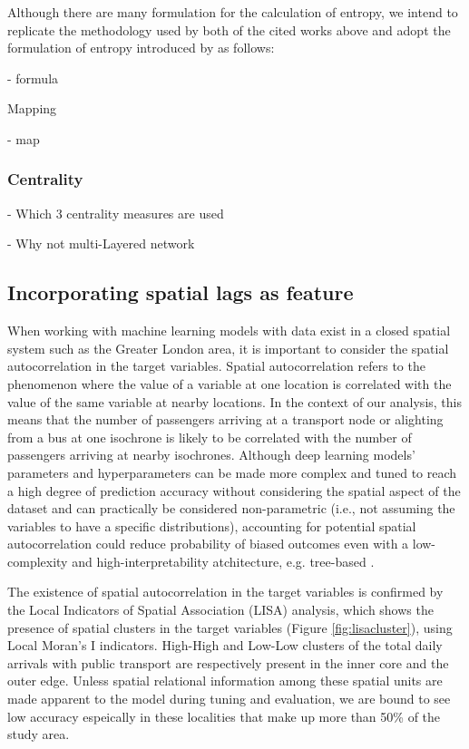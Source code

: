 Although there are many formulation for the calculation of entropy, we intend to replicate the methodology used by both of the cited works above and adopt the formulation of entropy introduced by \citet{shannonMathematicalTheoryCommunication1948} as follows:

- formula

Mapping

- map



\subsubsection*{Centrality}
- Which 3 centrality measures are used




- Why not multi-Layered network
\subsection{Incorporating spatial lags as feature}

When working with machine learning models with data exist in a closed spatial system such as the Greater London area, it is important to consider the spatial autocorrelation in the target variables. Spatial autocorrelation refers to the phenomenon where the value of a variable at one location is correlated with the value of the same variable at nearby locations. In the context of our analysis, this means that the number of passengers arriving at a transport node or alighting from a bus at one isochrone is likely to be correlated with the number of passengers arriving at nearby isochrones. Although deep learning models' parameters and hyperparameters can be made more complex and tuned to reach a high degree of prediction accuracy without considering the spatial aspect of the dataset and can practically be considered non-parametric (i.e., not assuming the variables to have a specific distributions), accounting for potential spatial autocorrelation could reduce probability of biased outcomes even with a low-complexity and high-interpretability atchitecture, e.g. tree-based \citep{meyerImportanceSpatialPredictor2019}.

The existence of spatial autocorrelation in the target variables is confirmed by the Local Indicators of Spatial Association (LISA) analysis, which shows the presence of spatial clusters in the target variables (Figure \ref{fig:lisacluster}), using Local Moran's I indicators. High-High and Low-Low clusters of the total daily arrivals with public transport are respectively present in the inner core and the outer edge. Unless spatial relational information among these spatial units are made apparent to the model during tuning and evaluation, we are bound to see low accuracy espeically in these localities that make up more than 50\% of the study area.  

